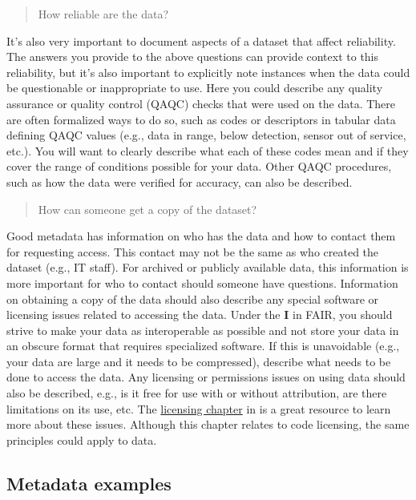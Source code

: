 \documentclass[
]{book}
\begin{document}
\begin{quote}
How reliable are the data?
\end{quote}

It's also very important to document aspects of a dataset that affect reliability. The answers you provide to the above questions can provide context to this reliability, but it's also important to explicitly note instances when the data could be questionable or inappropriate to use. Here you could describe any quality assurance or quality control (QAQC) checks that were used on the data. There are often formalized ways to do so, such as codes or descriptors in tabular data defining QAQC values (e.g., data in range, below detection, sensor out of service, etc.). You will want to clearly describe what each of these codes mean and if they cover the range of conditions possible for your data. Other QAQC procedures, such as how the data were verified for accuracy, can also be described.

\begin{quote}
How can someone get a copy of the dataset?
\end{quote}

Good metadata has information on who has the data and how to contact them for requesting access. This contact may not be the same as who created the dataset (e.g., IT staff). For archived or publicly available data, this information is more important for who to contact should someone have questions. Information on obtaining a copy of the data should also describe any special software or licensing issues related to accessing the data. Under the \textbf{I} in FAIR, you should strive to make your data as interoperable as possible and not store your data in an obscure format that requires specialized software. If this is unavoidable (e.g., your data are large and it needs to be compressed), describe what needs to be done to access the data. Any licensing or permissions issues on using data should also be described, e.g., is it free for use with or without attribution, are there limitations on its use, etc. The \href{https://r-pkgs.org/license.html}{licensing chapter} in \citet{Wickham15} is a great resource to learn more about these issues. Although this chapter relates to code licensing, the same principles could apply to data.

\hypertarget{metadata}{%
\subsection{Metadata examples}\label{metadata}}
\end{document}
